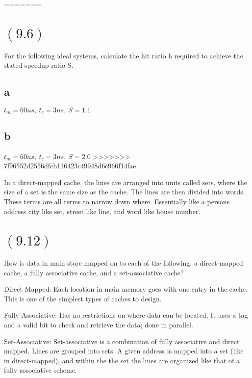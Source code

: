 \documentclass[letterpaper,12pt,titlepage]{article}
\begin{document}
=======
\section*{$(9.6)$} For the following ideal systems, calculate the hit ratio h required to achieve the stated speedup ratio S.

\subsection*{a} $t_m=60ns,~t_c=3ns,~S=1.1$
\begin{mdframed}[style=MyFrame]
\end{mdframed}
\subsection*{b} $t_m=60ns,~t_c=3ns,~S=2.0$
>>>>>>> 7f96552d2556dfcb116423c49948d6c966f14fae
\begin{mdframed}[style=MyFrame]
In a direct-mapped cache, the lines are arranged into units called sets, where the size of a set is the same size as the cache. The lines are then divided into words. These terms are all terms to narrow down where. Essentially like a persons address city like set, street like line, and word like house number. 
\end{mdframed}

\section*{$(9.12)$} How is data in main store mapped on to each of the following: a direct-mapped cache, a fully associative cache, and a set-associative cache? 

\begin{mdframed}[style=MyFrame]



Direct Mapped: Each location in main memory goes with one entry in the cache. This is one of the simplest types of caches to design.


Fully Associative: Has no restrictions on where data can be located. It uses a tag and a valid bit to check and retrieve the data; done in parallel. 

Set-Associative: Set-associative is a combination of fully associative and direct mapped. Lines are grouped into sets. A given address is mapped into a set (like in direct-mapped), and within the the set the lines are organized like that of a fully associative scheme. 

\end{mdframed}
\newpage
\end{document}
